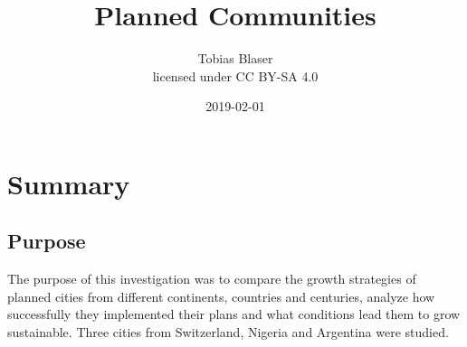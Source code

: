 \documentclass{article}
\title{\vspace{0.5cm}\Huge Planned Communities\vspace{9.5cm}}
\date{2019-02-01}
\author{Tobias Blaser\vspace{0.25cm}\\licensed under CC BY-SA 4.0}
\begin{document}
	
	\maketitle
 	
 	\restoregeometry	
	
	
	
	\clearpage
	\tableofcontents
	
	
	
	\clearpage
	\section{Summary}
		\subsection{Purpose}
		The purpose of this investigation was to compare the growth strategies of planned cities from different continents, countries and centuries, analyze how successfully they implemented their plans and what conditions lead them to grow sustainable. Three cities from Switzerland, Nigeria and Argentina were studied.
		
\end{document}
